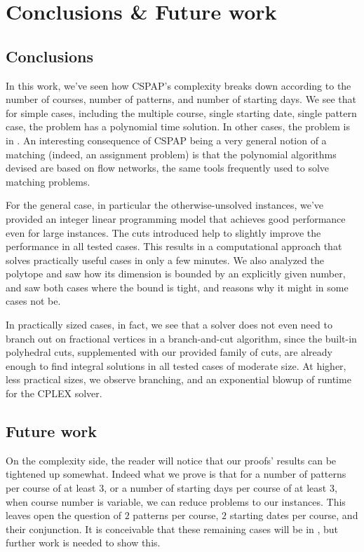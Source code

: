 \chapter{Conclusions \& Future work}

\section{Conclusions}

In this work, we've seen how CSPAP's complexity breaks down according to the number of courses, number of patterns, and number of starting days. We see that for simple cases, including the multiple course, single starting date, single pattern case, the problem has a polynomial time solution. In other cases, the problem is in \npc. An interesting consequence of CSPAP being a very general notion of a matching (indeed, an assignment problem) is that the polynomial algorithms devised are based on flow networks, the same tools frequently used to solve matching problems.

For the general case, in particular the otherwise-unsolved \npc instances, we've provided an integer linear programming model that achieves good performance even for large instances. The cuts introduced help to slightly improve the performance in all tested cases. This results in a computational approach that solves practically useful cases in only a few minutes. We also analyzed the polytope and saw how its dimension is bounded by an explicitly given number, and saw both cases where the bound is tight, and reasons why it might in some cases not be.

In practically sized cases, in fact, we see that a solver does not even need to branch out on fractional vertices in a branch-and-cut algorithm, since the built-in polyhedral cuts, supplemented with our provided family of cuts, are already enough to find integral solutions in all tested cases of moderate size. At higher, less practical sizes, we observe branching, and an exponential blowup of runtime for the CPLEX solver.

\section{Future work}

On the complexity side, the reader will notice that our proofs' results can be tightened up somewhat. Indeed what we prove is that for a number of patterns per course of at least $3$, or a number of starting days per course of at least $3$, when course number is variable, we can reduce \npc problems to our instances. This leaves open the question of $2$ patterns per course, $2$ starting dates per course, and their conjunction. It is conceivable that these remaining cases will be in \p, but further work is needed to show this.

